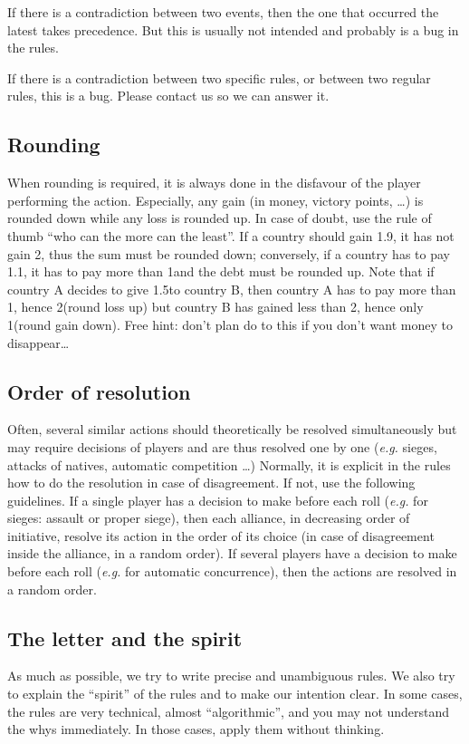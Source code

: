 \aparag If there is a contradiction between two events, then the one that
occurred the latest takes precedence. But this is usually not intended and
probably is a bug in the rules.

\aparag If there is a contradiction between two specific rules, or between two
regular rules, this is a bug. Please contact us so we can answer it.



\subsection{Rounding}

\aparag When rounding is required, it is always done in the disfavour of the
player performing the action.
\bparag Especially, any gain (in money, victory points, \ldots) is rounded
down while any loss is rounded up.
\bparag In case of doubt, use the rule of thumb ``who can the more can the
least''. If a country should gain 1.9\ducats, it has not gain 2\ducats, thus
the sum must be rounded down; conversely, if a country has to pay 1.1\ducats,
it has to pay more than 1\ducats and the debt must be rounded up.
\bparag Note that if country A decides to give 1.5\ducats to country B, then
country A has to pay more than 1\ducats, hence 2\ducats (round loss up) but
country B has gained less than 2\ducats, hence only 1\ducats (round gain
down). Free hint: don't plan do to this if you don't want money to
disappear\ldots

\subsection{Order of resolution}
\aparag Often, several similar actions should theoretically be resolved
simultaneously but may require decisions of players and are thus resolved one
by one (\emph{e.g.} sieges, attacks of natives, automatic competition \ldots)
Normally, it is explicit in the rules how to do the resolution in case of
disagreement. If not, use the following guidelines.
\bparag If a single player has a decision to make before each roll
(\emph{e.g.} for sieges: assault or proper siege), then each alliance, in
decreasing order of initiative, resolve its action in the order of its choice
(in case of disagreement inside the alliance, in a random order).
\bparag If several players have a decision to make before each roll
(\emph{e.g.} for automatic concurrence), then the actions are resolved in a
random order.

\subsection{The letter and the spirit}
\aparag As much as possible, we try to write precise and unambiguous rules. We
also try to explain the ``spirit'' of the rules and to make our intention
clear.
\bparag In some cases, the rules are very technical, almost ``algorithmic'',
and you may not understand the whys immediately. In those cases, apply them
without thinking.

